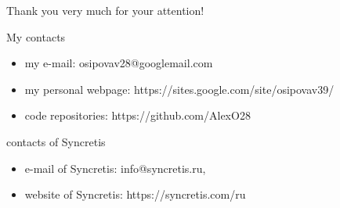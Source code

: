 \documentclass{beamer}
\begin{document}
\begin{frame}{Thank you very much for your attention!}

\begin{block}{My contacts}
\begin{itemize}
	\item my e-mail: osipovav28@googlemail.com
	\item my personal webpage: https://sites.google.com/site/osipovav39/
	\item code repositories: https://github.com/AlexO28
\end{itemize}
\end{block}
\begin{block}{contacts of Syncretis}
\begin{itemize}
	\item e-mail of Syncretis: info@syncretis.ru,
	\item website of Syncretis: https://syncretis.com/ru
\end{itemize}
\end{block}

\end{frame}
\end{document}
